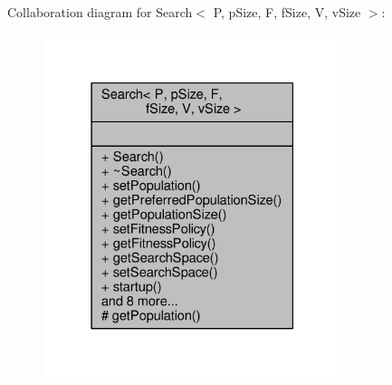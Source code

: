 Collaboration diagram for Search$<$ P, p\+Size, F, f\+Size, V, v\+Size $>$\+:
\nopagebreak
\begin{figure}[H]
\begin{center}
\leavevmode
\includegraphics[width=247pt]{classSearch__coll__graph}
\end{center}
\end{figure}
